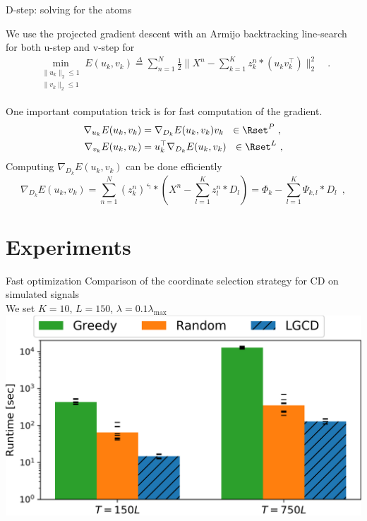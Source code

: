 \documentclass{beamer}
\begin{document}
\begin{frame}{D-step: solving for the atoms}

	We use the projected gradient descent with an Armijo backtracking line-search \cite{Wright1999} for both u-step and v-step for
	\begin{equation}
		\begin{split}
			\min_{\substack{\|u_{k}\|_2 \leq 1\\\|v_{k}\|_2 \leq 1}} E(u_k, v_k) \overset{\Delta}{=} \sum_{n=1}^N\frac{1}{2}\|X^n - \sum_{k=1}^K z^n_k * (u_k^{ }  v_k^\top) \|_{2}^{2} \hspace{6pt}
			\enspace .
		\end{split}
	\end{equation}

	One important computation trick is for fast computation of the gradient.
	\[
	\begin{split}
		\nabla_{u_k} E(u_k, v_k) &=  \nabla_{D_k}E(u_k, v_k) v_k ~~ \in \Rset^{P}~,\\
		\nabla_{v_k} E(u_k, v_k) &=  u_k^\top \nabla_{D_k} E(u_k, v_k)  ~~ \in \Rset^L~,
	\end{split}
	\]
	Computing $\nabla_{D_k} E(u_k, v_k)$ can be done efficiently
	\[
	\nabla_{D_{k}} E(u_k, v_k) =  \sum_{n=1}^N (z_k^n)^\Lsh * \left(X^n - \sum_{l=1}^K z^n_l * D_l\right)
	=  \Phi_k - \sum_{l=1}^K \Psi_{k, l} *  D_l \enspace ,
	\]

\end{frame}

\section{Experiments}

\begin{frame}{Fast optimization}
    Comparison of the coordinate selection strategy for CD on simulated signals\\
    We set $K=10$, $L=150$, $\lambda = 0.1 \lambda_{\max}$\\[1em]
    \centering
    \includegraphics[width=.9\textwidth]{CD_strategies_comparison.png}
\end{frame}
\end{document}
